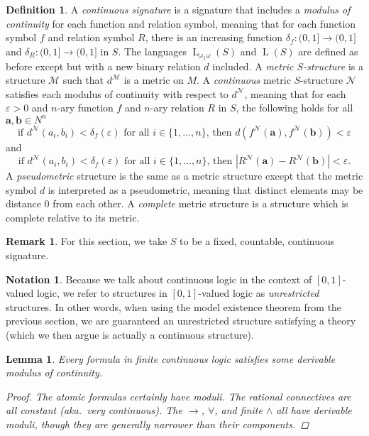 \documentclass{amsart}
\newtheorem{lemma}[theorem]{Lemma}
\theoremstyle{definition}
\newtheorem{remark}[theorem]{Remark}
\newtheorem{definition}[theorem]{Definition}
\newtheorem{notation}[theorem]{Notation}
\numberwithin{equation}{theorem}
\renewcommand{\epsilon}{\varepsilon}
\newcommand{\V}{\mathbf}
\newcommand{\narrow}[1]{\xrightarrow{#1}}
\renewcommand{\to}{\narrow{}}
\newcommand{\baselang}{\operatorname{L}}
\newcommand{\lang}{\baselang_{\omega_1\omega}}
\begin{document}
\begin{definition}
  A \emph{continuous signature} is a signature that includes a \emph{modulus of continuity} for each function and relation symbol, meaning that for each function symbol $f$ and relation symbol $R$, there is an increasing function $\delta_f:(0,1]\to(0,1]$ and $\delta_R:(0,1]\to(0,1]$ in $S$.
  The languages $\lang(S)$ and $\baselang(S)$ are defined as before except but with a new binary relation $d$ included.
  A \emph{metric $S$-structure} is a structure $\mathcal M$ such that $d^\mathcal M$ is a metric on $M$.
  A \emph{continuous} metric $S$-structure $\mathcal N$ satisfies each modulus of continuity with respect to $d^\mathcal N$, meaning that for each $\epsilon>0$ and $n$-ary function $f$ and $n$-ary relation $R$ in $S$, the following holds for all $\V a,\V b\in N^n$
  \[
    \text{if $d^\mathcal N(a_i,b_i)<\delta_f(\epsilon)$ for all $i\in\{1,\dots,n\}$, then $d(f^\mathcal N(\V a),f^\mathcal N(\V b))<\epsilon$}
  \]
  and
  \[
    \text{if $d^\mathcal N(a_i,b_i)<\delta_f(\epsilon)$ for all $i\in\{1,\dots,n\}$, then $|R^\mathcal N(\V a)-R^\mathcal N(\V b)|<\epsilon$}.
  \]
  A \emph{pseudometric} structure is the same as a metric structure except that the metric symbol $d$ is interpreted as a pseudometric, meaning that distinct elements may be distance 0 from each other.
  A \emph{complete} metric structure is a structure which is complete relative to its metric.
\end{definition}
\begin{remark}
  For this section, we take $S$ to be a fixed, countable, continuous signature.
\end{remark}
\begin{notation}
  Because we talk about continuous logic in the context of $[0,1]$-valued logic, we refer to structures in $[0,1]$-valued logic as \emph{unrestricted} structures.
  In other words, when using the model existence theorem from the previous section, we are guaranteed an unrestricted structure satisfying a theory (which we then argue is actually a continuous structure).
\end{notation}
\begin{lemma}
  Every formula in finite continuous logic satisfies some derivable modulus of continuity.
  \begin{proof}
    The atomic formulas certainly have moduli.
    The rational connectives are all constant (aka.\ very continuous).
    The $\to$, $\forall$, and finite $\wedge$ all have derivable moduli, though they are generally narrower than their components.
  \end{proof}
\end{lemma}
\end{document}
